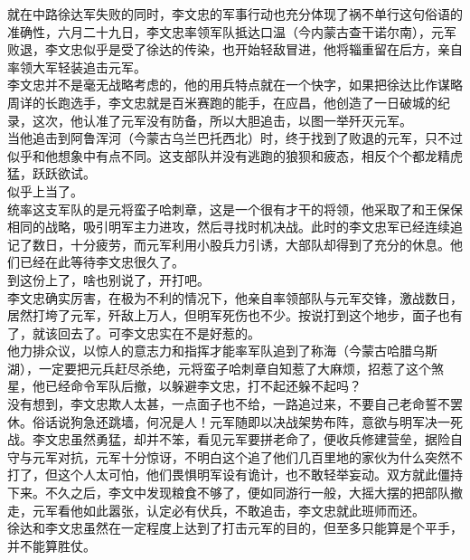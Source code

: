 \begin{multicols}{\theparacolNo}
就在中路徐达军失败的同时，李文忠的军事行动也充分体现了祸不单行这句俗语的准确性，六月二十九日，李文忠率领军队抵达口温（今内蒙古查干诺尔南），元军败退，李文忠似乎是受了徐达的传染，也开始轻敌冒进，他将辎重留在后方，亲自率领大军轻装追击元军。\\

李文忠并不是毫无战略考虑的，他的用兵特点就在一个快字，如果把徐达比作谋略周详的长跑选手，李文忠就是百米赛跑的能手，在应昌，他创造了一日破城的纪录，这次，他认准了元军没有防备，所以大胆追击，以图一举歼灭元军。\\

当他追击到阿鲁浑河（今蒙古乌兰巴托西北）时，终于找到了败退的元军，只不过似乎和他想象中有点不同。这支部队并没有逃跑的狼狈和疲态，相反个个都龙精虎猛，跃跃欲试。\\

似乎上当了。\\

统率这支军队的是元将蛮子哈刺章，这是一个很有才干的将领，他采取了和王保保相同的战略，吸引明军主力进攻，然后寻找时机决战。此时的李文忠军已经连续追记了数日，十分疲劳，而元军利用小股兵力引诱，大部队却得到了充分的休息。他们已经在此等待李文忠很久了。\\

到这份上了，啥也别说了，开打吧。\\

李文忠确实厉害，在极为不利的情况下，他亲自率领部队与元军交锋，激战数日，居然打垮了元军，歼敌上万人，但明军死伤也不少。按说打到这个地步，面子也有了，就该回去了。可李文忠实在不是好惹的。\\

他力排众议，以惊人的意志力和指挥才能率军队追到了称海（今蒙古哈腊乌斯湖），一定要把元兵赶尽杀绝，元将蛮子哈刺章自知惹了大麻烦，招惹了这个煞星，他已经命令军队后撤，以躲避李文忠，打不起还躲不起吗？\\

没有想到，李文忠欺人太甚，一点面子也不给，一路追过来，不要自己老命誓不罢休。俗话说狗急还跳墙，何况是人！元军随即以决战架势布阵，意欲与明军决一死战。李文忠虽然勇猛，却并不笨，看见元军要拼老命了，便收兵修建营垒，据险自守与元军对抗，元军十分惊讶，不明白这个追了他们几百里地的家伙为什么突然不打了，但这个人太可怕，他们畏惧明军设有诡计，也不敢轻举妄动。双方就此僵持下来。不久之后，李文中发现粮食不够了，便如同游行一般，大摇大摆的把部队撤走，元军看他如此嚣张，认定必有伏兵，不敢追击，李文忠就此班师而还。\\

徐达和李文忠虽然在一定程度上达到了打击元军的目的，但至多只能算是个平手，并不能算胜仗。\\


\end{multicols}
